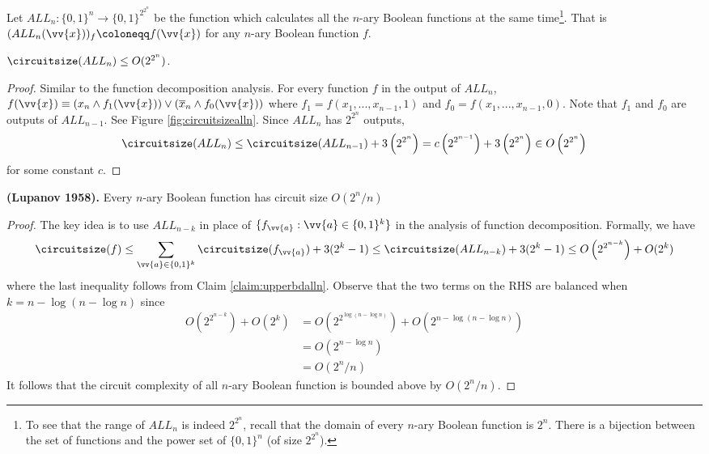 	Let $ALL_n: \{0,1\}^n \rightarrow \{0,1\}^{2^{2^{n}}}$ be the function which calculates all the $n$-ary Boolean functions at the same time\footnote{To see that the range of $ALL_n$ is indeed $2^{2^{n}}$, recall that the domain of every $n$-ary Boolean function is $2^{n}$. There is a bijection between the set of functions and the power set of $\{0,1\}^n$ (of size $2^{2^{n}}$).}. That is $(ALL_n(\vv{x}))_f \coloneqq f(\vv{x})$ for any $n$-ary Boolean function $f$.
	
	\begin{claim}
		\label{claim:upperbdalln}
		$\circuitsize(ALL_n) \leq O(2^{2^{n}})$.
	\end{claim}
	\begin{proof}
		Similar to the function decomposition analysis. For every function $f$ in the output of $ALL_n$, $f(\vv{x}) \equiv \left(x_n \land f_{1}(\vv{x})\right) \lor \left(\overline{x}_n \land f_{0}(\vv{x})\right)$ where $f_1 = f(x_1, ..., x_{n-1}, 1)$ and $f_0 = f(x_1, ..., x_{n-1}, 0)$. Note that $f_1$ and $f_0$ are outputs of $ALL_{n-1}$. See Figure \ref{fig:circuitsizealln}. Since $ALL_n$ has $2^{2^{n}}$ outputs,
		\[\circuitsize(ALL_n) \leq \circuitsize(ALL_{n-1}) + 3\left(2^{2^{n}}\right) = c\left(2^{2^{n-1}}\right) + 3\left(2^{2^{n}}\right) \in O\left(2^{2^{n}}\right)\]
		for some constant $c$. 
	\end{proof}
	
	\begin{theorem}
		\label{thm:lupanov1958-circuitsizeupperbd}
		\textbf{(Lupanov 1958).} Every $n$-ary Boolean function has circuit size $O(2^n/n)$
	\end{theorem}
	\begin{proof}
		The key idea is to use $ALL_{n-k}$ in place of $\{f_{\vv{a}}: \vv{a} \in \{0,1\}^k\}$ in the analysis of function decomposition. Formally, we have 
		\[\circuitsize(f) \leq \sum_{\vv{a} \in \{0,1\}^k}\circuitsize(f_{\vv{a}}) + 3(2^k - 1) \leq \circuitsize(ALL_{n-k}) + 3(2^k - 1) \leq O\left(2^{2^{n-k}}\right) + O(2^k)\]
		where the last inequality follows from Claim \ref{claim:upperbdalln}. Observe that the two terms on the RHS are balanced when $k = n - \log(n - \log n)$ since
		\begin{align*}
			 O\left(2^{2^{n-k}}\right) + O\left(2^k\right) &= O\left(2^{2^{\log(n - \log n)}}\right) + O\left(2^{n - \log(n - \log n)}\right)\\
			 &= O\left(2^{n - \log n}\right)\\
			 &= O\left(2^n/n\right)
		\end{align*}
		It follows that the circuit complexity of all $n$-ary Boolean function is bounded above by $O(2^n/n)$.
	\end{proof}
	
